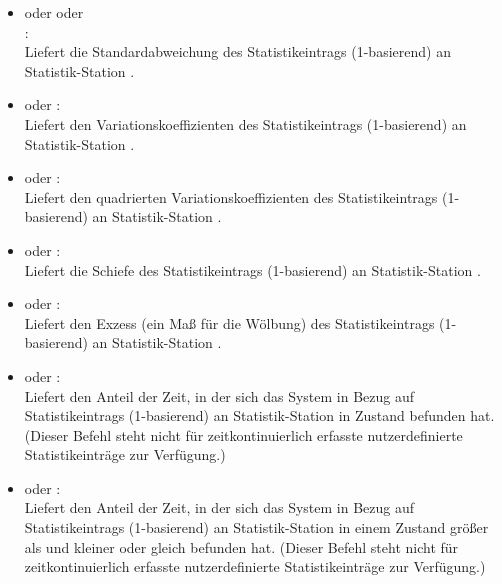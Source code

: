 \begin{itemize}
\item
{} oder  oder\\
:\\
Liefert die Standardabweichung des Statistikeintrags  (1-basierend) an Statistik-Station .

\item
{} oder :\\
Liefert den Variationskoeffizienten des Statistikeintrags  (1-basierend) an Statistik-Station .

\item
{} oder :\\
Liefert den quadrierten Variationskoeffizienten des Statistikeintrags  (1-basierend) an Statistik-Station .

\item
{} oder :\\
Liefert die Schiefe des Statistikeintrags  (1-basierend) an Statistik-Station .

\item
{} oder :\\
Liefert den Exzess (ein Maß für die Wölbung) des Statistikeintrags  (1-basierend) an Statistik-Station .

\item
{} oder :\\
Liefert den Anteil der Zeit, in der sich das System in Bezug auf Statistikeintrags  (1-basierend) an Statistik-Station  in Zustand  befunden hat.
(Dieser Befehl steht nicht für zeitkontinuierlich erfasste nutzerdefinierte Statistikeinträge zur Verfügung.)

\item
{} oder :\\
Liefert den Anteil der Zeit, in der sich das System in Bezug auf Statistikeintrags  (1-basierend) an Statistik-Station  in einem Zustand größer als  und kleiner oder gleich  befunden hat.
(Dieser Befehl steht nicht für zeitkontinuierlich erfasste nutzerdefinierte Statistikeinträge zur Verfügung.)

\end{itemize}


